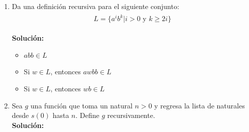 \documentclass[11pt,letterpaper]{article}
\begin{document}
\begin{enumerate}

    \item Da una definición recursiva para el siguiente conjunto: \\
        \begin{equation*} \begin{split} \begin{gathered}
            L = \{a^i b^k | i > 0 \text{ y } k \geq 2i\}
        \end{gathered} \end{split} \end{equation*}

        \textbf{Solución:}
        \begin{itemize}
            \item $abb \in L$
            \item Si $w \in L$, entonces $awbb \in L$
            \item Si $w \in L$, entonces $wb \in L$
        \end{itemize}

    \item Sea $g$ una función que toma un natural $n > 0$ y regresa la lista de naturales
    desde $s(0)$ hasta $n$. Define $g$ recursivamente. \\

        \textbf{Solución:}
        


\end{enumerate}
\end{document}
